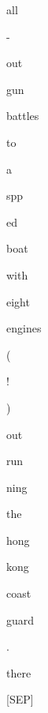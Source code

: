 \documentclass[varwidth=150mm]{standalone}
\begin{document}
\begin{CJK*}{UTF8}{gbsn}
{{{\colorbox{red!0.0}{\strut all} \colorbox{red!2.1174731254577637}{\strut -} \colorbox{red!0.0}{\strut out} \colorbox{red!2.7926104068756104}{\strut gun} \colorbox{red!3.6829991340637207}{\strut battles} \colorbox{red!4.091067314147949}{\strut to} \colorbox{red!3.2184791564941406}{\strut a} \colorbox{red!2.7452120780944824}{\strut spp}\colorbox{red!1.1544091701507568}{\strut ed}\colorbox{red!7.81751012802124}{\strut boat} \colorbox{red!4.118288040161133}{\strut with} \colorbox{red!0.0}{\strut eight} \colorbox{red!3.4992733001708984}{\strut engines} \colorbox{red!6.444252967834473}{\strut (} \colorbox{red!3.6073694229125977}{\strut !} \colorbox{red!0.0}{\strut )} \colorbox{red!0.0}{\strut out}\colorbox{red!5.213838577270508}{\strut run}\colorbox{red!2.2777371406555176}{\strut ning} \colorbox{red!5.4373064041137695}{\strut the} \colorbox{red!27.93791389465332}{\strut hong} \colorbox{red!36.76995849609375}{\strut kong} \colorbox{red!7.052189826965332}{\strut coast} \colorbox{red!4.819234371185303}{\strut guard} \colorbox{red!0.0}{\strut .} \colorbox{red!22.886812210083008}{\strut there} \colorbox{red!3.8452746868133545}{\strut [SEP]}
}}}
\end{CJK*}
\end{document}
